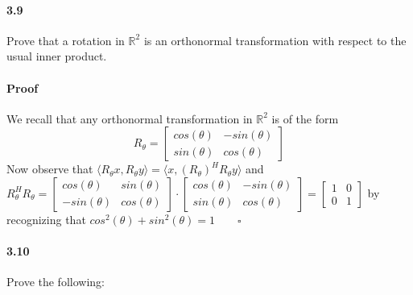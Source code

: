 \documentclass[letterpaper,12pt]{article}
\theoremstyle{definition}
\begin{document}
\paragraph{3.9} Prove that a rotation in  $\mathds{R}^2$ is an orthonormal transformation with respect to the usual inner product.

\paragraph{Proof} We recall that any orthonormal transformation in $\mathds{R}^2$ is of the form 
$$ R_{\theta}  = 
  \begin{bmatrix}
    cos(\theta) & -sin(\theta) \\
    sin(\theta) & cos(\theta) 
  \end{bmatrix}$$ 
Now observe that  
$ \langle R_{\theta} x  , R_{\theta} y  \rangle  = \langle x  , ( R_{\theta})^H R_{\theta} y  \rangle$ and  $R_{\theta}^H R_{\theta} = \begin{bmatrix}
    cos(\theta) & sin(\theta) \\
    -sin(\theta) & cos(\theta) 
  \end{bmatrix} \cdot 
  \begin{bmatrix}
    cos(\theta) & -sin(\theta) \\
    sin(\theta) & cos(\theta) 
  \end{bmatrix}
  = \begin{bmatrix}
    1 & 0 \\
    0 & 1 
  \end{bmatrix}$ by recognizing that  $ cos^2(\theta) + sin^2(\theta) = 1 \qquad\square$



\paragraph{3.10} Prove the following:
\end{document}
